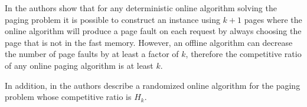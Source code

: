 In \cite{paging-deterministic} the authors show that for any deterministic
online algorithm solving the paging problem it is possible to construct an
instance using $k + 1$ pages where the online algorithm will produce a
page fault on each request by always choosing the page that is not in the
fast memory. However, an offline algorithm can decrease the number of page
faults by at least a factor of $k$, therefore the competitive ratio of any
online paging algorithm is at least $k$.

In addition, in \cite{paging-randomized} the authors describe a randomized
online algorithm for the paging problem whose competitive ratio is $H_k$.
